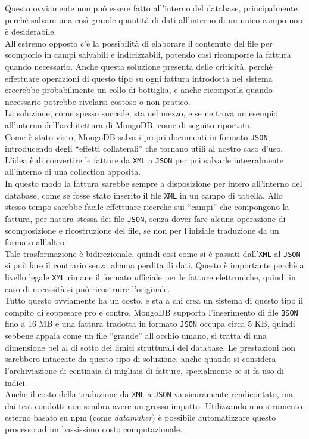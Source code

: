 \noindent Questo ovviamente non può essere fatto all'interno del database, principalmente perchè salvare una così grande quantità di dati all'interno di un unico campo non è desiderabile.\\
All'estremo opposto c'è la possibilità di elaborare il contenuto del file per scomporlo in campi salvabili e indicizzabili, potendo così ricomporre la fattura quando necessario. Anche questa soluzione presenta delle criticità, perchè effettuare operazioni di questo tipo su ogni fattura introdotta nel sistema creerebbe probabilmente un collo di bottiglia, e anche ricomporla quando necessario potrebbe rivelarsi costoso o non pratico.\\

\noindent La soluzione, come spesso succede, sta nel mezzo, e se ne trova un esempio all'interno dell'architettura di MongoDB, come di seguito riportato.\\
Come è stato visto, MongoDB salva i propri documenti in formato \texttt{JSON}, introducendo degli ``effetti collaterali'' che tornano utili al nostro caso d'uso.\\
L'idea è di convertire le fatture da \texttt{XML} a \texttt{JSON} per poi salvarle integralmente all'interno di una collection apposita.\\
In questo modo la fattura sarebbe sempre a disposizione per intero all'interno del database, come se fosse stato inserito il file \texttt{XML} in un campo di tabella. Allo stesso tempo sarebbe facile effettuare ricerche sui ``campi'' che compongono la fattura, per natura stessa dei file \texttt{JSON}, senza dover fare alcuna operazione di scomposizione e ricostruzione del file, se non per l'iniziale traduzione da un formato all'altro.\\

\noindent Tale trasformazione è bidirezionale, quindi così come si è passati dall'\texttt{XML} al \texttt{JSON} si può fare il contrario senza alcuna perdita di dati. Questo è importante perchè a livello legale \texttt{XML} rimane il formato ufficiale per le fatture elettroniche, quindi in caso di necessità si può ricostruire l'originale.\\

\noindent Tutto questo ovviamente ha un costo, e sta a chi crea un sistema di questo tipo il compito di soppesare pro e contro. MongoDB supporta l'inserimento di file \texttt{BSON} fino a 16 MB e una fattura tradotta in formato \texttt{JSON} occupa circa 5 KB, quindi sebbene appaia come un file ``grande'' all'occhio umano, si tratta di una dimensione bel al di sotto dei limiti strutturali del database. Le prestazioni non sarebbero intaccate da questo tipo di soluzione, anche quando si considera l'archiviazione di centinaia di migliaia di fatture, specialmente se si fa uso di indici.\\
Anche il costo della traduzione da \texttt{XML} a \texttt{JSON} va sicuramente rendicontato, ma dai test condotti non sembra avere un grosso impatto. Utilizzando uno strumento esterno basato su \gls{npm} (come \textit{datamaker}) è possibile automatizzare questo processo ad un bassissimo costo computazionale.\\


